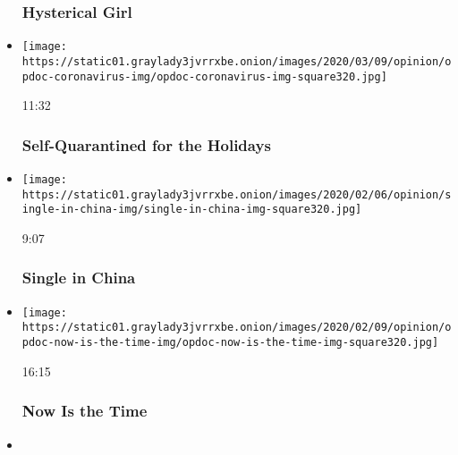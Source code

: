 \begin{itemize}
{  \subsubsection{Hysterical Girl}\label{hysterical-girl}}
\item
  \href{https://www.nytimes3xbfgragh.onion/video/opinion/100000007013675/self-quarantined-for-the-holidays.html?action=click\&module=video-series-bar\&region=header\&pgtype=Article\&playlistId=video/op-docs}{}

  \texttt{[image: https://static01.graylady3jvrrxbe.onion/images/2020/03/09/opinion/opdoc-coronavirus-img/opdoc-coronavirus-img-square320.jpg]}

  11:32

  \hypertarget{self-quarantined-for-the-holidays}{%
  \subsubsection{Self-Quarantined for the
  Holidays}\label{self-quarantined-for-the-holidays}}
\item
  \href{https://www.nytimes3xbfgragh.onion/video/opinion/100000006948977/single-in-china.html?action=click\&module=video-series-bar\&region=header\&pgtype=Article\&playlistId=video/op-docs}{}

  \texttt{[image: https://static01.graylady3jvrrxbe.onion/images/2020/02/06/opinion/single-in-china-img/single-in-china-img-square320.jpg]}

  9:07

  \hypertarget{single-in-china}{%
  \subsubsection{Single in China}\label{single-in-china}}
\item
  \href{https://www.nytimes3xbfgragh.onion/video/opinion/100000006946174/now-is-the-time.html?action=click\&module=video-series-bar\&region=header\&pgtype=Article\&playlistId=video/op-docs}{}

  \texttt{[image: https://static01.graylady3jvrrxbe.onion/images/2020/02/09/opinion/opdoc-now-is-the-time-img/opdoc-now-is-the-time-img-square320.jpg]}

  16:15

  \hypertarget{now-is-the-time}{%
  \subsubsection{Now Is the Time}\label{now-is-the-time}}
\item
  \href{https://www.nytimes3xbfgragh.onion/video/opinion/100000006923399/betye-saar-taking-care-of-business.html?action=click\&module=video-series-bar\&region=header\&pgtype=Article\&playlistId=video/op-docs}{}


\end{itemize}
